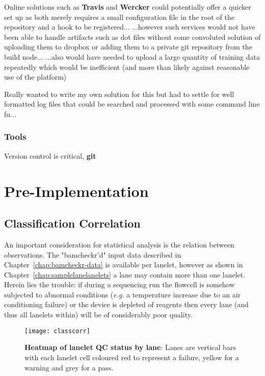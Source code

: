 Online solutions such as \textbf{Travis} and \textbf{Wercker} could potentially
offer a quicker set up as both merely requires a small configuration file in the
root of the repository and a hook to be registered...
...however such services would
not have been able to handle artifacts such as dot files without some convoluted
solution of uploading them to dropbox or adding them to a private git repository
from the build node...  ...also would have needed to upload a large
quantity of training data repeatedly which would be inefficient (and more than
likely against reasonable use of the platform)

Really wanted to write my own solution for this but had to settle for well
formatted log files that could be searched and processed with some command line
fu...

\subsection{Tools}
Version control is critical, \textbf{git}


\chapter{Pre-Implementation}
\section{Classification Correlation}

An important consideration for statistical analysis is the relation between
observations. The "bamcheckr'd" input data described in
Chapter~\ref{chap:bamcheckr-data} is available per lanelet, however as shown in
Chapter~\ref{chap:samplelanelanelets} a lane may contain more than one lanelet.
Herein lies the trouble: if during a sequencing run the flowcell is somehow
subjected to abnormal conditions (\textit{e.g.} a temperature increase due to an air
conditioning failure) or the device is depleted of reagents then every lane (and
thus all lanelets within) will be of considerably poor quality.

\begin{figure}[htbp!]
    \centering
    \texttt{[image: classcorr]}
    \caption[ClassCorr]{\textbf{Heatmap of lanelet QC status by lane}: Lanes are
    vertical bars with each lanelet cell coloured red to represent a failure,
yellow for a warning and grey for a pass.}
    \label{fig:classcorr}
\end{figure}

